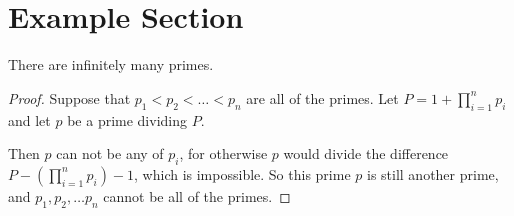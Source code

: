 \section{Example Section}
\begin{thm}[Euclid]
    There are infinitely many primes.
\end{thm}

\begin{proof}
    Suppose that $p_1 < p_2 < \dots < p_n$ are all of the primes.
    Let $P = 1 + \prod_{i=1}^n p_i$ and let $p$ be a prime dividing $P$.

    Then $p$ can not be any of $p_i$, for otherwise $p$ would divide the
    difference $P - \left(\prod_{i=1}^n p_i \right) - 1$, which is impossible.
    So this prime $p$ is still another prime, and $p_1, p_2, \dots p_n$
    cannot be all of the primes.
\end{proof}
